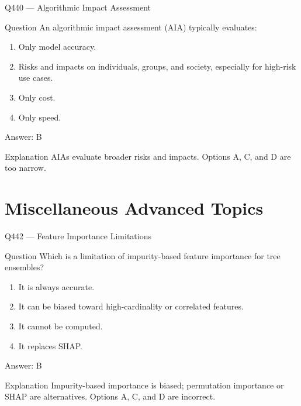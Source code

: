 \documentclass[aspectratio=169,8pt]{beamer}
\begin{document}
	\begin{frame}{Q440 --- Algorithmic Impact Assessment}
		\begin{block}{Question}
			An algorithmic impact assessment (AIA) typically evaluates:
			\begin{enumerate}
				\item Only model accuracy.
				\item Risks and impacts on individuals, groups, and society, especially for high-risk use cases.
				\item Only cost.
				\item Only speed.
			\end{enumerate}
		\end{block}
		\begin{exampleblock}{Answer: B}\end{exampleblock}
		\begin{block}{Explanation}
			AIAs evaluate broader risks and impacts. Options A, C, and D are too narrow.
		\end{block}
	\end{frame}
	
	\section{Miscellaneous Advanced Topics}

	
	\begin{frame}{Q442 --- Feature Importance Limitations}
		\begin{block}{Question}
			Which is a limitation of impurity-based feature importance for tree ensembles?
			\begin{enumerate}
				\item It is always accurate.
				\item It can be biased toward high-cardinality or correlated features.
				\item It cannot be computed.
				\item It replaces SHAP.
			\end{enumerate}
		\end{block}
		\begin{exampleblock}{Answer: B}\end{exampleblock}
		\begin{block}{Explanation}
			Impurity-based importance is biased; permutation importance or SHAP are alternatives. Options A, C, and D are incorrect.
		\end{block}
	\end{frame}
	
\end{document}

